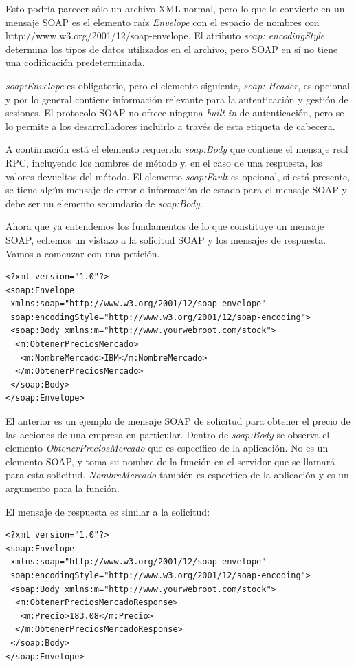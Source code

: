 Esto podría parecer sólo un archivo XML normal, pero lo que lo convierte en un mensaje SOAP es el elemento 
raíz \textit{Envelope} con el espacio de nombres con http://www.w3.org/2001/12/soap-envelope. El atributo 
\textit{soap: encodingStyle} determina los tipos de datos utilizados en el archivo, pero SOAP en sí no 
tiene una codificación predeterminada.

\textit{soap:Envelope} es obligatorio, pero el elemento siguiente, \textit{soap: Header}, es opcional y 
por lo general contiene información relevante para la autenticación y gestión de sesiones. 
El protocolo SOAP no ofrece ninguna \textit{built-in} de autenticación, pero se lo permite a los desarrolladores 
incluirlo a través de esta etiqueta de cabecera.

A continuación está el elemento requerido \textit{soap:Body} que contiene el mensaje real RPC, incluyendo 
los nombres de método y, en el caso de una respuesta, los valores devueltos del método. El elemento 
\textit{soap:Fault} es opcional, si está presente, se tiene algún mensaje de error o información de estado 
para el mensaje SOAP y debe ser un elemento secundario de \textit{soap:Body}.

Ahora que ya entendemos los fundamentos de lo que constituye un mensaje SOAP, echemos un vistazo a la 
solicitud SOAP y los mensajes de respuesta. Vamos a comenzar con una petición.

\begin{verbatim}
<?xml version="1.0"?>
<soap:Envelope
 xmlns:soap="http://www.w3.org/2001/12/soap-envelope"
 soap:encodingStyle="http://www.w3.org/2001/12/soap-encoding">
 <soap:Body xmlns:m="http://www.yourwebroot.com/stock">
  <m:ObtenerPreciosMercado>
   <m:NombreMercado>IBM</m:NombreMercado>
  </m:ObtenerPreciosMercado>
 </soap:Body>
</soap:Envelope>
\end{verbatim}

El anterior es un ejemplo de mensaje SOAP de solicitud para obtener el precio de las acciones de una 
empresa en particular. Dentro de \textit{soap:Body} se observa el elemento \textit{ObtenerPreciosMercado} que es 
específico de la aplicación. No es un elemento SOAP, y toma su nombre de la función en el servidor que se 
llamará para esta solicitud. \textit{NombreMercado} también es específico de la aplicación y es un argumento 
para la función.

El mensaje de respuesta es similar a la solicitud:

\begin{verbatim}
<?xml version="1.0"?>
<soap:Envelope
 xmlns:soap="http://www.w3.org/2001/12/soap-envelope"
 soap:encodingStyle="http://www.w3.org/2001/12/soap-encoding">
 <soap:Body xmlns:m="http://www.yourwebroot.com/stock">
  <m:ObtenerPreciosMercadoResponse>
   <m:Precio>183.08</m:Precio>
  </m:ObtenerPreciosMercadoResponse>
 </soap:Body>
</soap:Envelope>
\end{verbatim}

